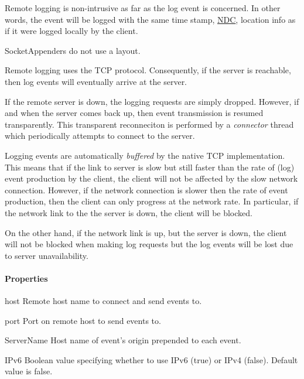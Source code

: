 \begin{DoxyItemize}
\item Remote logging is non-\/intrusive as far as the log event is concerned. In other words, the event will be logged with the same time stamp, \hyperlink{classlog4cplus_1_1NDC}{N\-D\-C}, location info as if it were logged locally by the client.


\item Socket\-Appenders do not use a layout.


\item Remote logging uses the T\-C\-P protocol. Consequently, if the server is reachable, then log events will eventually arrive at the server.


\item If the remote server is down, the logging requests are simply dropped. However, if and when the server comes back up, then event transmission is resumed transparently. This transparent reconneciton is performed by a {\itshape connector} thread which periodically attempts to connect to the server.


\item Logging events are automatically {\itshape buffered} by the native T\-C\-P implementation. This means that if the link to server is slow but still faster than the rate of (log) event production by the client, the client will not be affected by the slow network connection. However, if the network connection is slower then the rate of event production, then the client can only progress at the network rate. In particular, if the network link to the the server is down, the client will be blocked.


\item On the other hand, if the network link is up, but the server is down, the client will not be blocked when making log requests but the log events will be lost due to server unavailability. 
\end{DoxyItemize}

\paragraph*{Properties}


\begin{DoxyDescription}
\item[{\ttfamily host} ]Remote host name to connect and send events to.


\item[{\ttfamily port} ]Port on remote host to send events to.


\item[{\ttfamily Server\-Name} ]Host name of event's origin prepended to each event.


\item[{\ttfamily I\-Pv6} ]Boolean value specifying whether to use I\-Pv6 (true) or I\-Pv4 (false). Default value is false.


\end{DoxyDescription}

